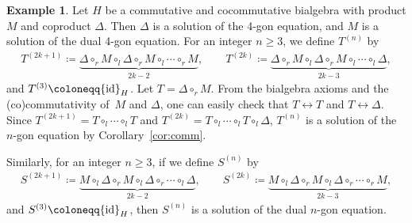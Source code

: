 \documentclass[pdftex]{sigma}
\numberwithin{equation}{section}
\theoremstyle{definition}
\newtheorem{Example}[Theorem]{Example}
\begin{document}
\begin{Example}\label{ex:ex from comm Hopf}
 Let $H$ be a commutative and cocommutative bialgebra with product $M$ and coproduct $\Delta$.
 Then $\Delta$ is a solution of the 4-gon equation, and $M$ is a solution of the dual 4-gon equation.
 For an integer $n \geq 3$, we define $T^{(n)}$ by
 \begin{align*}
 T^{(2k+1)} \coloneqq \underbrace{\Delta \circ_r M \circ_l \Delta \circ_r M \circ_l \cdots \circ_{r} M}_{2k-2}, \qquad T^{(2k)} \coloneqq \underbrace{\Delta \circ_r M \circ_l \Delta \circ_r M \circ_l \cdots \circ_{l} \Delta}_{2k-3},
 \end{align*}
 and $T^{(3)} \coloneqq {\rm id}_H$.
 Let $T = \Delta \circ_r M$.
 From the bialgebra axioms and the (co)commutativity of~$M$ and $\Delta$, one can easily check that $T\leftrightarrow T$ and $T \leftrightarrow \Delta$.
 Since $T^{(2k+1)}=T\circ_l\cdots \circ_l T$ and $T^{(2k)}=T\circ_l\cdots \circ_l T\circ_l \Delta$, $T^{(n)}$ is a solution of the $n$-gon equation by Corollary~\ref{cor:comm}.

 Similarly, for an integer $n \geq 3$, if we define $S^{(n)}$ by
 \begin{align*}
 S^{(2k+1)} \coloneqq \underbrace{M \circ_l \Delta \circ_r M \circ_l \Delta \circ_r \cdots \circ_l \Delta}_{2k-2}, \qquad S^{(2k)} \coloneqq \underbrace{M \circ_l \Delta \circ_r M \circ_l \Delta \circ_r \cdots \circ_r M}_{2k-3},
 \end{align*}
 and $S^{(3)} \coloneqq {\rm id}_H$, then $S^{(n)}$ is a solution of the dual $n$-gon equation.
\end{Example}
\end{document}
